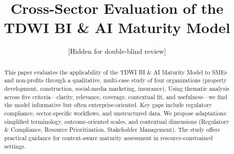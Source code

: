 \documentclass[conference]{IEEEtran}
\begin{document}
\title{Cross-Sector Evaluation of the TDWI BI \& AI Maturity Model\\
}


\author{
[Hidden for double-blind review]
}



\maketitle

\begin{abstract}
This paper evaluates the applicability of the TDWI BI \& AI Maturity Model to SMEs and non-profits through a qualitative, multi-case study of four organizations (property development, construction, social-media marketing, insurance). Using thematic analysis across five criteria---clarity, relevance, coverage, contextual fit, and usefulness---we find the model informative but often enterprise-oriented. Key gaps include regulatory compliance, sector-specific workflows, and unstructured data. We propose adaptations: simplified terminology, outcome-oriented scales, and contextual dimensions (Regulatory \& Compliance, Resource Prioritization, Stakeholder Management). The study offers practical guidance for context-aware maturity assessment in resource-constrained settings.
\end{abstract}
\end{document}
